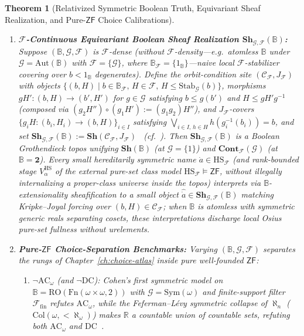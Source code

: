 \documentclass[10pt,twoside,openright]{book}
\theoremstyle{crmplain}
\newtheorem{theorem}{Theorem}[section]
\theoremstyle{crmdef}
\theoremstyle{crmremark}
\begin{document}
\begin{theorem}[Relativized Symmetric Boolean Truth, Equivariant Sheaf Realization, and Pure-$\mathsf{ZF}$ Choice Calibrations]
\begin{enumerate}[label=\textup{(\roman*)},leftmargin=2.0em]
  \item \textbf{$\mathcal{F}$-Continuous Equivariant Boolean Sheaf Realization $\mathbf{Sh}_{\mathcal{G}, \mathcal{F}}(\mathbb{B})$:} Suppose $(\mathbb{B}, \mathcal{G}, \mathcal{F})$ is \emph{$\mathcal{F}$-dense} (without $\mathcal{F}$-density---e.g.\ atomless $\mathbb{B}$ under $\mathcal{G} = \mathrm{Aut}(\mathbb{B})$ with $\mathcal{F} = \{\mathcal{G}\}$, where $\mathbb{B}_{\mathcal{F}} = \{1_{\mathbb{B}}\}$---naive local $\mathcal{F}$-stabilizer covering over $b < 1_{\mathbb{B}}$ degenerates). Define the \emph{orbit-condition site} $(\mathcal{C}_{\mathcal{F}}, J_{\mathcal{F}})$ with objects $\{(b, H) \mid b \in \mathbb{B}_{\mathcal{F}},\, H \in \mathcal{F},\, H \le \mathrm{Stab}_{\mathcal{G}}(b)\}$, morphisms $g H' : (b, H) \to (b', H')$ for $g \in \mathcal{G}$ satisfying $b \le g(b')$ and $H \le g H' g^{-1}$ (composed via $(g_2 H'') \circ (g_1 H') := (g_1 g_2) H''$), and $J_{\mathcal{F}}$-covers $\{g_i H : (b_i, H_i) \to (b, H)\}_{i \in I}$ satisfying $\bigvee_{i \in I,\, h \in H} h(g_i^{-1}(b_i)) = b$, and set $\mathbf{Sh}_{\mathcal{G}, \mathcal{F}}(\mathbb{B}) := \mathbf{Sh}(\mathcal{C}_{\mathcal{F}}, J_{\mathcal{F}})$~\cite{Fourman80} (cf.~\cite[\S D4.5]{Johnstone02}). Then $\mathbf{Sh}_{\mathcal{G}, \mathcal{F}}(\mathbb{B})$ is a Boolean Grothendieck topos unifying $\mathbf{Sh}(\mathbb{B})$ (at $\mathcal{G} = \{1\}$) and $\mathbf{Cont}_{\mathcal{F}}(\mathcal{G})$ (at $\mathbb{B} = \mathbf{2}$). Every \emph{small} hereditarily symmetric name $\dot{a} \in \mathrm{HS}_{\mathcal{F}}$ (and rank-bounded stage $V^{\mathrm{HS}}_\alpha$ of the external pure-set class model $\mathrm{HS}_{\mathcal{F}} \models \mathsf{ZF}$, without illegally internalizing a proper-class universe inside the topos) interprets via $\mathbb{B}$-extensionality sheafification to a small object $\widehat{\dot{a}} \in \mathbf{Sh}_{\mathcal{G}, \mathcal{F}}(\mathbb{B})$ matching Kripke--Joyal forcing over $(b, H) \in \mathcal{C}_{\mathcal{F}}$; when $\mathbb{B}$ is atomless with symmetric generic reals separating cosets, these interpretations discharge local Osius pure-set fullness without urelements.
  \item \textbf{Pure-$\mathsf{ZF}$ Choice-Separation Benchmarks:} Varying $(\mathbb{B}, \mathcal{G}, \mathcal{F})$ separates the rungs of Chapter~\ref{ch:choice-atlas} inside pure well-founded $\mathsf{ZF}$:
  \begin{enumerate}[label=\textup{(\alph*)},leftmargin=1.6em]
    \item \emph{$\neg\mathrm{AC}_\omega$ (and $\neg\mathrm{DC}$):} Cohen's first symmetric model on $\mathbb{B} = \mathrm{RO}(\mathrm{Fn}(\omega \times \omega, 2))$ with $\mathcal{G} = \mathrm{Sym}(\omega)$ and finite-support filter $\mathcal{F}_{\mathrm{fin}}$ refutes $\mathrm{AC}_\omega$, while the Feferman--L\'evy symmetric collapse of $\aleph_n$ ($\mathrm{Col}(\omega, <\!\aleph_\omega)$) makes $\mathbb{R}$ a countable union of countable sets, refuting \emph{both} $\mathrm{AC}_\omega$ and $\mathrm{DC}$~\cite[Chs.~5, 10]{Jech73}.

\end{enumerate}
\end{enumerate}
\end{theorem}
\end{document}
